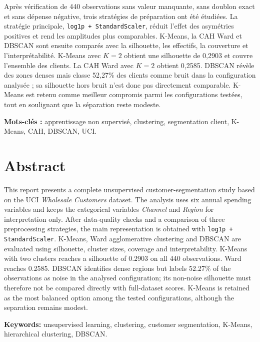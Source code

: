 \documentclass[12pt,oneside]{book}
\begin{document}
Après vérification de 440 observations sans valeur manquante, sans doublon exact et sans dépense négative, trois stratégies de préparation ont été étudiées. La stratégie principale, \texttt{log1p + StandardScaler}, réduit l'effet des asymétries positives et rend les amplitudes plus comparables. K-Means, la CAH Ward et DBSCAN sont ensuite comparés avec la silhouette, les effectifs, la couverture et l'interprétabilité. K-Means avec $K=2$ obtient une silhouette de 0,2903 et couvre l'ensemble des clients. La CAH Ward avec $K=2$ obtient 0,2585. DBSCAN révèle des zones denses mais classe 52,27\% des clients comme bruit dans la configuration analysée ; sa silhouette hors bruit n'est donc pas directement comparable. K-Means est retenu comme meilleur compromis parmi les configurations testées, tout en soulignant que la séparation reste modeste.

\textbf{Mots-clés :} apprentissage non supervisé, clustering, segmentation client, K-Means, CAH, DBSCAN, UCI.

\chapter*{Abstract}
This report presents a complete unsupervised customer-segmentation study based on the UCI \textit{Wholesale Customers} dataset. The analysis uses six annual spending variables and keeps the categorical variables \textit{Channel} and \textit{Region} for interpretation only. After data-quality checks and a comparison of three preprocessing strategies, the main representation is obtained with \texttt{log1p + StandardScaler}. K-Means, Ward agglomerative clustering and DBSCAN are evaluated using silhouette, cluster sizes, coverage and interpretability. K-Means with two clusters reaches a silhouette of 0.2903 on all 440 observations. Ward reaches 0.2585. DBSCAN identifies dense regions but labels 52.27\% of the observations as noise in the analysed configuration; its non-noise silhouette must therefore not be compared directly with full-dataset scores. K-Means is retained as the most balanced option among the tested configurations, although the separation remains modest.

\textbf{Keywords:} unsupervised learning, clustering, customer segmentation, K-Means, hierarchical clustering, DBSCAN.
\end{document}
